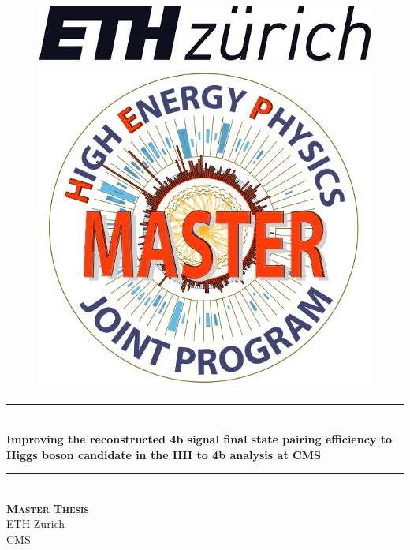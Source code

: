 \documentclass[11pt]{article}
\numberwithin{figure}{section}  %
\numberwithin{table}{section}   %
\numberwithin{equation}{section} %
\begin{document}
\begin{titlepage}
\newcommand{\HRule}{\rule{\linewidth}{0.5mm}}
\begin{figure}[H]
\noindent
\begin{minipage}{.5\textwidth}
\begin{flushleft}
    \includegraphics[scale=0.15]{Logos/Unknown.png}
\end{flushleft}
\end{minipage}
\begin{minipage}{.5\textwidth}
\begin{flushright}
\includegraphics[scale=0.2]{Logos/logo_hep_centre_texte_coupe.png}
\end{flushright}
\end{minipage}

\end{figure}
\center
\HRule \\[0.4cm]
{ \huge \bfseries  Improving the reconstructed 4b signal final state pairing efficiency to Higgs boson candidate in the HH to 4b analysis at CMS
 \\[0.15cm] }
 \HRule \\[0.5cm]
 \center 
\textsc{\LARGE\textbf{Master Thesis}}\\[1cm]
{\Large ETH Zurich}\\[0.5cm]
{\Large CMS}\\[1cm]


\end{titlepage}
\end{document}
